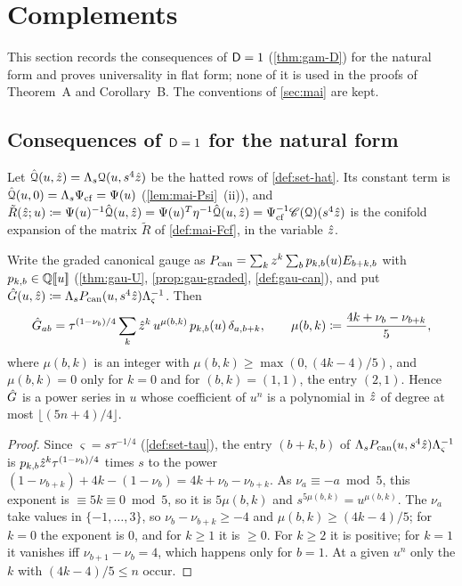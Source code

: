 \section{Complements}
\label{sec:cmp}

This section records the consequences of $\mathsf{D}=1$ (\cref{thm:gam-D}) for the natural form and proves universality in flat form; none of it is used in the proofs of Theorem~A and Corollary~B. The conventions of \cref{sec:mai} are kept.

\subsection{Consequences of \texorpdfstring{$\mathsf{D}=1$}{D=1} for the natural form}
\label{sec:mai-nat}

Let $\hat{\mathcal{Q}}(u,\hat{z})=\Lambda_s\mathcal{Q}(u,s^4\hat{z})$ be the hatted rows of \cref{def:set-hat}. Its constant term is $\hat{\mathcal{Q}}(u,0)=\Lambda_s\Psi_{\mathrm{cf}}=\Psi(u)$ (\cref{lem:mai-Psi}~(ii)), and $\tilde R(\hat{z};u)\coloneqq\Psi(u)^{-1}\hat{\mathcal{Q}}(u,\hat{z})=\Psi(u)^T\eta^{-1}\hat{\mathcal{Q}}(u,\hat{z})=\Psi_{\mathrm{cf}}^{-1}\mathscr{C}(\mathcal{Q})(s^4\hat{z})$ is the conifold expansion of the matrix $\tilde R$ of \cref{def:mai-Fcf}, in the variable $\hat{z}$.

\begin{lem}
\label{lem:mai-Ghat}
Write the graded canonical gauge as $P_{\mathrm{can}}=\sum_kz^k\sum_bp_{k,b}(u)E_{b+k,b}$ with $p_{k,b}\in\mathbb{Q}[\![ u ]\!]$ (\cref{thm:gau-U}, \cref{prop:gau-graded}, \cref{def:gau-can}), and put $\hat{G}(u,\hat{z})\coloneqq\Lambda_sP_{\mathrm{can}}(u,s^4\hat{z})\Lambda_\varsigma^{-1}$. Then
\[
\hat{G}_{ab}=\tau^{(1-\nu_b)/4}\sum_k\hat{z}^k\,u^{\mu(b,k)}\,p_{k,b}(u)\,\delta_{a,b+k},\qquad\mu(b,k)\coloneqq\frac{4k+\nu_b-\nu_{b+k}}{5},
\]
where $\mu(b,k)$ is an integer with $\mu(b,k)\geq\max(0,(4k-4)/5)$, and $\mu(b,k)=0$ only for $k=0$ and for $(b,k)=(1,1)$, the entry $(2,1)$. Hence $\hat{G}$ is a power series in $u$ whose coefficient of $u^n$ is a polynomial in $\hat{z}$ of degree at most $\lfloor(5n+4)/4\rfloor$.
\end{lem}

\begin{proof}
Since $\varsigma=s\tau^{-1/4}$ (\cref{def:set-tau}), the entry $(b+k,b)$ of $\Lambda_sP_{\mathrm{can}}(u,s^4\hat{z})\Lambda_\varsigma^{-1}$ is $p_{k,b}\hat{z}^k\tau^{(1-\nu_b)/4}$ times $s$ to the power $(1-\nu_{b+k})+4k-(1-\nu_b)=4k+\nu_b-\nu_{b+k}$. As $\nu_a\equiv-a\bmod5$, this exponent is $\equiv5k\equiv0\bmod5$, so it is $5\mu(b,k)$ and $s^{5\mu(b,k)}=u^{\mu(b,k)}$. The $\nu_a$ take values in $\{-1,\dots,3\}$, so $\nu_b-\nu_{b+k}\geq-4$ and $\mu(b,k)\geq(4k-4)/5$; for $k=0$ the exponent is $0$, and for $k\geq1$ it is $\geq0$. For $k\geq2$ it is positive; for $k=1$ it vanishes iff $\nu_{b+1}-\nu_b=4$, which happens only for $b=1$. At a given $u^n$ only the $k$ with $(4k-4)/5\leq n$ occur.
\end{proof}

